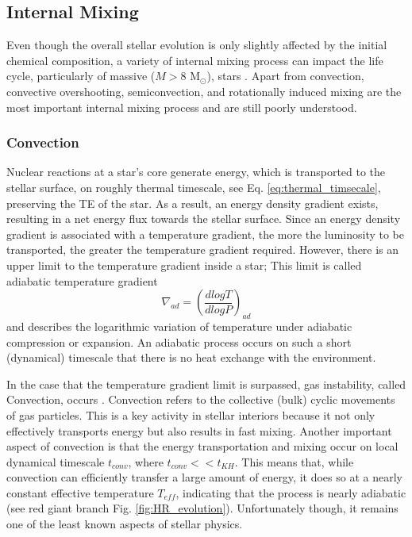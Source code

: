 \subsection{Internal Mixing}\label{sub:mixing}

Even though the overall stellar evolution is only slightly affected by the initial chemical composition, a variety of internal mixing process can impact the life cycle, particularly of massive ($M>8$ M$_{\odot}$), stars \citep{langer2012presupernova}. Apart from convection, convective overshooting, semiconvection, and rotationally induced mixing are the most important internal mixing process \citep{schootemeijer2019constraining} and are still poorly understood. 

\subsubsection{Convection}

Nuclear reactions at a star's core generate energy,
which is transported to the stellar surface, on roughly thermal timescale, see Eq. \eqref{eq:thermal_timsecale}, preserving the TE of the star. As a result, an energy density gradient exists, resulting in a net energy flux towards the stellar surface. Since an energy density gradient is associated with a temperature gradient, the more the luminosity to be transported, the greater the temperature gradient required. However, there is an upper limit to the temperature gradient inside a star; This limit is called adiabatic temperature gradient
\begin{equation}\label{eq:ad_tempe_grad}
    \nabla_{ad} = \left ( \frac{d logT}{d logP} \right)_{ad} 
\end{equation}
and describes the logarithmic variation of temperature under adiabatic compression or expansion. An adiabatic process occurs on such a short (dynamical) timescale that there is no heat exchange with the environment.

In the case that the temperature gradient limit is surpassed, gas instability, called Convection, occurs \citep{pols2011stellar}. Convection refers to the collective (bulk) cyclic movements of gas particles. This is a key activity in stellar interiors because it not only effectively transports energy but also results in fast mixing. Another important aspect of convection is that the energy transportation and mixing occur on local dynamical timescale $t_{conv}$, where $t_{conv} << t_{KH}$. This means that, while convection can efficiently transfer a large amount of energy, it does so at a nearly constant effective temperature $T_{eff}$, indicating that the process is nearly adiabatic (see red giant branch Fig. \ref{fig:HR_evolution}). Unfortunately though, it remains one of the least known aspects of stellar physics.

